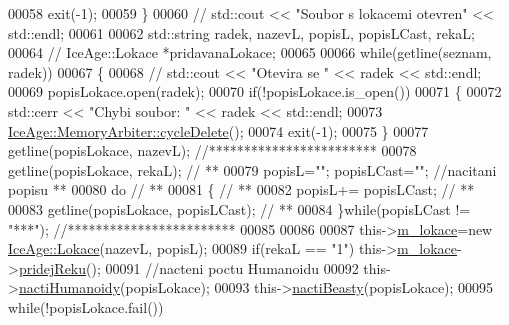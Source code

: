 \begin{DoxyCode}
00058         exit(-1);
00059     \}
00060 \textcolor{comment}{//    std::cout << "Soubor s lokacemi otevren" << std::endl;}
00061 
00062     std::string radek, nazevL, popisL, popisLCast, rekaL; 
00064 \textcolor{comment}{//    IceAge::Lokace *pridavanaLokace;}
00065 
00066     \textcolor{keywordflow}{while}(getline(seznam, radek)) 
00067     \{
00068 \textcolor{comment}{//        std::cout << "Otevira se " << radek << std::endl;}
00069         popisLokace.open(radek); 
00070         \textcolor{keywordflow}{if}(!popisLokace.is\_open())
00071         \{
00072             std::cerr << \textcolor{stringliteral}{"Chybi soubor: "} << radek << std::endl;
00073             \hyperlink{classIceAge_1_1MemoryArbiter_ae3460492678cf992629f4a70de3ef1ca}{IceAge::MemoryArbiter::cycleDelete}(); 
00074             exit(-1);
00075         \}
00077         getline(popisLokace, nazevL);           \textcolor{comment}{//************************}
00078         getline(popisLokace, rekaL);            \textcolor{comment}{//                      **}
00079         popisL=\textcolor{stringliteral}{""}; popisLCast=\textcolor{stringliteral}{""};               \textcolor{comment}{//nacitani popisu       **}
00080         \textcolor{keywordflow}{do}                                      \textcolor{comment}{//                      **}
00081         \{                                       \textcolor{comment}{//                      **}
00082             popisL+= popisLCast;                \textcolor{comment}{//                      **}
00083             getline(popisLokace, popisLCast);   \textcolor{comment}{//                      **}
00084         \}\textcolor{keywordflow}{while}(popisLCast != \textcolor{stringliteral}{"***"});            \textcolor{comment}{//************************}
00085 
00086 
00087         this->\hyperlink{classIceAge_1_1BuilderLokace_aad0fb17bf38c03cd767e100758348f24}{m\_lokace}=\textcolor{keyword}{new} \hyperlink{classIceAge_1_1Lokace}{IceAge::Lokace}(nazevL, popisL);
00089         \textcolor{keywordflow}{if}(rekaL == \textcolor{stringliteral}{"1"}) this->\hyperlink{classIceAge_1_1BuilderLokace_aad0fb17bf38c03cd767e100758348f24}{m\_lokace}->\hyperlink{classIceAge_1_1Lokace_a5b8cba97ec44efafc0b105a3b487284c}{pridejReku}(); 
00091 \textcolor{comment}{//nacteni poctu Humanoidu}
00092         this->\hyperlink{classIceAge_1_1BuilderLokace_a98fae825f3de1d12408a85f03d98f2fd}{nactiHumanoidy}(popisLokace); 
00093         this->\hyperlink{classIceAge_1_1BuilderLokace_a8424c61902a53f9304460055f478601b}{nactiBeasty}(popisLokace); 
00095         \textcolor{keywordflow}{while}(!popisLokace.fail()) 

\end{DoxyCode}
